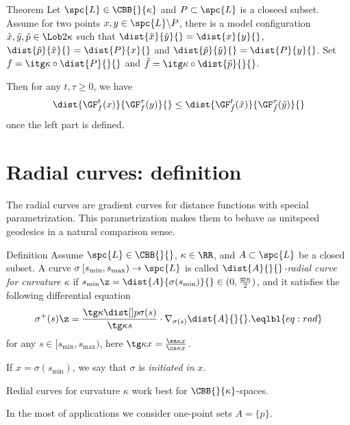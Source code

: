 \begin{thm}{Theorem}
Let $\spc{L}\in\CBB{}{\kappa}$ 
and $P\subset \spc{L}$ is a closeed subset.
Assume for two points $x,y\in\spc{L}\backslash P$, there is a model configuration
$\tilde x,\tilde y,\tilde p\in \Lob2{\kappa}$ 
such that $\dist{\tilde x}{\tilde y}{}=\dist{x}{y}{}$, $\dist{\tilde p}{\tilde x}{}=\dist{P}{x}{}$ and $\dist{\tilde p}{\tilde y}{}=\dist{P}{y}{}$.
Set $f=\itg\kappa\circ\dist{P}{}{}$ 
and $\tilde f=\itg\kappa\circ\dist{\tilde p}{}{}$.

Then for any $t,\tau\ge 0$, we have
$$\dist{\GF_{f}^t(x)}{\GF_{f}^\tau(y)}{}
\le
\dist{\GF_{\tilde f}^t(\tilde x)}{\GF_{\tilde f}^\tau(\tilde y)}{}$$ 
once the left part is defined.
\end{thm}













\section{Radial curves: definition}\label{sec:rad-curv}

The radial curves are gradient curves for distance functions with special parametrization.
This parametrization makes them to behave as unitspeed geodesics in a natural comparison sense.

\begin{thm}{Definition}\label{def:rad-curv}
Assume $\spc{L}\in\CBB{}{}$, 
$\kappa\in\RR$, 
and $A\subset \spc{L}$ be a closed subset.
A curve $\sigma\:[s_{\min},s_{\max})\to \spc{L}$  is called 
\emph{$\dist{A}{}{}$-radial curve for curvature $\kappa$} 
if
$s_{\min}
\z=
\dist{A}{\sigma(s_{\min})}{}\in(0,\tfrac{\varpi\kappa}2)$, 
and it satisfies the following differential equation
$$\sigma^+(s)
\z=
\frac{\tg\kappa\dist[{{}}]{p}{\sigma(s)}{}}{\tg\kappa s}
\cdot
\nabla_{\sigma(s)}\dist{A}{}{}.
\eqlbl{eq:rad}$$
for any $s\in[s_{\min},s_{\max})$, here $\tg\kappa x=\frac{\sn\kappa x}{\cs\kappa x}$.

If $x=\sigma(s_{\min})$, we say that $\sigma$ is \emph{initiated in}  $x$.
\end{thm}

Redial curves for curvature $\kappa$ 
work best for $\CBB{}{\kappa}$-spaces.

In the most of applications we consider one-point sets $A=\{p\}$.

